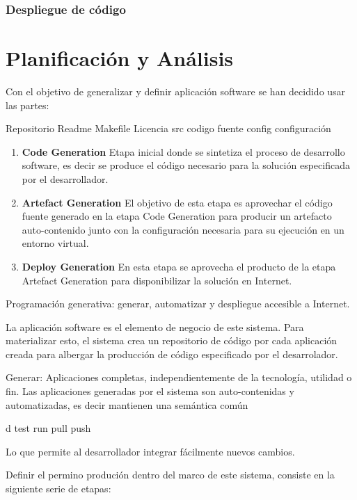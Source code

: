\documentclass[a4paper,11pt]{book}
\begin{document}
\subsection{Despliegue de código}
 

\chapter{Planificación y Análisis}


Con el objetivo de generalizar y definir aplicación software se han decidido usar las partes:

Repositorio
Readme
Makefile
Licencia
src codigo fuente
config configuración


\begin{enumerate}
\item \textbf{ Code Generation }  Etapa inicial donde se sintetiza el proceso de desarrollo software, es decir se produce el código necesario para la solución especificada por el desarrollador. 
\item \textbf{ Artefact Generation }  El objetivo de esta etapa es aprovechar el código fuente generado en la etapa Code Generation para producir un artefacto auto-contenido junto con la configuración necesaria para su ejecución en un entorno virtual. 
\item \textbf{ Deploy Generation } En esta etapa se aprovecha el producto de la etapa Artefact Generation para disponibilizar la solución en Internet. 
\end{enumerate}


Programación generativa: generar, automatizar  y despliegue accesible a Internet.


La aplicación software es el elemento de negocio de este sistema.  Para materializar esto, el sistema crea un repositorio de código por cada aplicación creada para albergar la producción de código especificado por  el desarrolador. 


Generar: Aplicaciones completas, independientemente de la tecnología, utilidad o fin. Las aplicaciones generadas por el sistema
son auto-contenidas y automatizadas, es decir mantienen una semántica común 




d
test
run
pull
push

Lo que permite al desarrollador integrar fácilmente nuevos cambios. 

Definir el permino produción dentro del marco de este sistema, consiste en la siguiente serie de etapas:
\end{document}

